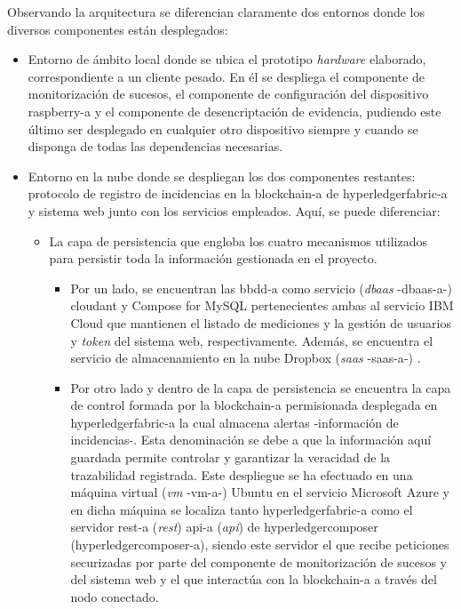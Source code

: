 \documentclass[12pt,a4paper, twoside]{report}
\begin{document}
	Observando la arquitectura se diferencian claramente dos entornos donde los diversos componentes están desplegados:

	\begin{itemize}
		\item Entorno de ámbito local donde se ubica el \gls{prototipo} \textit{hardware} elaborado, correspondiente a un cliente pesado. En él se despliega el componente de monitorización de sucesos, el componente de configuración del dispositivo \gls{raspberry-a} y el componente de desencriptación de evidencia, pudiendo este último ser desplegado en cualquier otro dispositivo siempre y cuando se disponga de todas las dependencias necesarias.
	
		\item Entorno en la nube donde se despliegan los dos componentes restantes: protocolo de registro de incidencias en la \gls{blockchain-a} de \gls{hyperledgerfabric-a} y sistema web junto con los servicios empleados. Aquí, se puede diferenciar:

		\begin{itemize}
			\item La capa de persistencia que engloba los cuatro mecanismos utilizados para persistir toda la información gestionada en el proyecto.
						
			\begin{itemize}
				\item Por un lado, se encuentran las \gls{bbdd-a} como servicio (\textit{\gls{dbaas}} -\gls{dbaas-a}-) \gls{cloudant} y Compose for MySQL pertenecientes ambas al servicio IBM Cloud que mantienen el listado de mediciones y la gestión de usuarios y \textit{\gls{token}} del sistema web, respectivamente. Además, se encuentra el servicio de almacenamiento en la nube Dropbox (\textit{\gls{saas}} -\gls{saas-a}-) \cite{gonzalez:2011:TCCS}.
			
				\item Por otro lado y dentro de la capa de persistencia se encuentra la capa de control formada por la \gls{blockchain-a} permisionada desplegada en \gls{hyperledgerfabric-a} la cual almacena alertas -información de incidencias-. Esta denominación se debe a que la información aquí guardada permite controlar y garantizar la veracidad de la trazabilidad registrada. Este despliegue se ha efectuado en una máquina virtual (\textit{\gls{vm}} -\gls{vm-a}-) Ubuntu en el servicio Microsoft Azure y en dicha máquina se localiza tanto \gls{hyperledgerfabric-a} como el servidor \gls{rest-a} (\textit{\gls{rest}}) \gls{api-a} (\textit{\gls{api}}) de \gls{hyperledgercomposer} (\gls{hyperledgercomposer-a}), siendo este servidor el que recibe peticiones securizadas por parte del componente de monitorización de sucesos y del sistema web y el que interactúa con la \gls{blockchain-a} a través del nodo conectado.								
			\end{itemize}  
		 				 				

\end{itemize}
\end{itemize}
\end{document}
